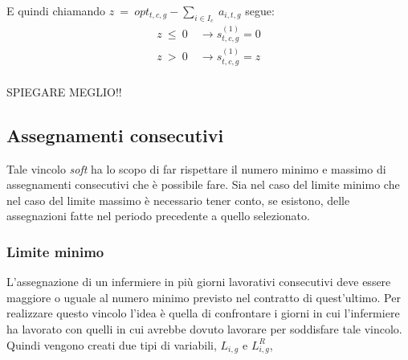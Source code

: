 E quindi chiamando $z ~ = ~ opt_{t,c,g} - \sum_{i \in I_c} ~ a_{i, t, g}$ segue:
\begin{equation}
\begin{split}
z ~ \leq ~ 0 ~ &\longrightarrow s^{(1)}_{t, c, g} = 0 \\
z ~ > ~ 0 ~ &\longrightarrow s^{(1)}_{t, c, g} = z \\
\end{split}
\end{equation}

SPIEGARE MEGLIO!!


\subsection{Assegnamenti consecutivi}
Tale vincolo \textit{soft} ha lo scopo di far rispettare il numero minimo e massimo di assegnamenti consecutivi che è possibile fare. Sia nel caso del limite minimo che nel caso del limite massimo è necessario tener conto, se esistono, delle assegnazioni fatte nel periodo precedente a quello selezionato.

\subsubsection{Limite minimo}
L'assegnazione di un infermiere in più giorni lavorativi consecutivi deve essere maggiore o uguale al numero minimo previsto nel contratto di quest'ultimo. Per realizzare questo vincolo l'idea è quella di confrontare i giorni in cui l'infermiere ha lavorato con quelli in cui avrebbe dovuto lavorare per soddisfare tale vincolo. Quindi vengono creati due tipi di variabili, $L_{i, g}$ e $L_{i, g}^R$,

